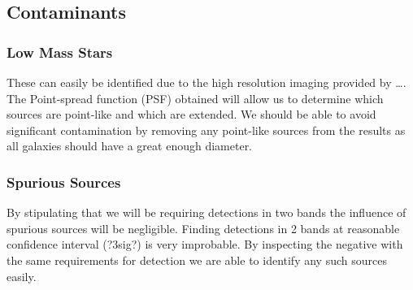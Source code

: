 
\subsection{Contaminants} %
\label{sub:contaminants}
    \subsubsection{Low Mass Stars} %
    \label{ssub:low_mass_stars}
        These can easily be identified due to the high resolution imaging provided by \ldots. The Point-spread function (PSF) obtained will allow us to determine which sources are point-like and which are extended. We should be able to avoid significant contamination by removing any point-like sources from the results as all galaxies should have a great enough diameter.

    \subsubsection{Spurious Sources} %
    \label{ssub:spurious_sources}
        By stipulating that we will be requiring detections in two bands the influence of spurious sources will be negligible. Finding detections in 2 bands at reasonable confidence interval (?3sig?) is very improbable. By inspecting the negative with the same requirements for detection we are able to identify any such sources easily\cite{Bouwens2011}.

